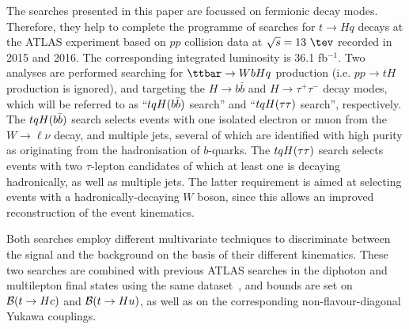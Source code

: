 
The searches presented in this paper are focussed on fermionic decay modes.
Therefore, they help to complete the programme of searches for $t \to Hq$ decays at the ATLAS experiment based on $pp$ collision 
data at $\sqrt{s}=13~\tev$ recorded in 2015 and 2016. The corresponding integrated luminosity is 36.1 fb$^{-1}$.
Two analyses are performed searching for $\ttbar \to WbHq$ production (i.e. $pp \to tH$ production is ignored), and targeting the 
$H \to b\bar{b}$ and $H \to \tau^+\tau^-$ decay modes, which will be referred to as ``$tqH(b\bar{b})$ search'' and ``$tqH(\tau\tau)$ search'', respectively.
The $tqH(b\bar{b})$ search selects events with one isolated electron or muon from the $W \to \ell\nu$ decay, and multiple jets, several 
of which are identified with high purity as originating from the hadronisation of $b$-quarks. 
The $tqH(\tau\tau)$ search selects events with two $\tau$-lepton candidates of which at least one is decaying hadronically, as well as multiple jets. 
The latter requirement is aimed at selecting events with a hadronically-decaying $W$ boson, since this allows an improved reconstruction of the
event kinematics.

Both searches employ different multivariate techniques to discriminate between the signal and the background on the basis of their different kinematics. 
These two searches are combined with previous ATLAS searches in the diphoton and multilepton final states using the same dataset~\cite{Aaboud:2017mfd,Aaboud:2018pob}, 
and bounds are set on $\mathcal{B}(t\to Hc)$ and $\mathcal{B}(t\to Hu)$, as well as on the corresponding non-flavour-diagonal Yukawa couplings. 






